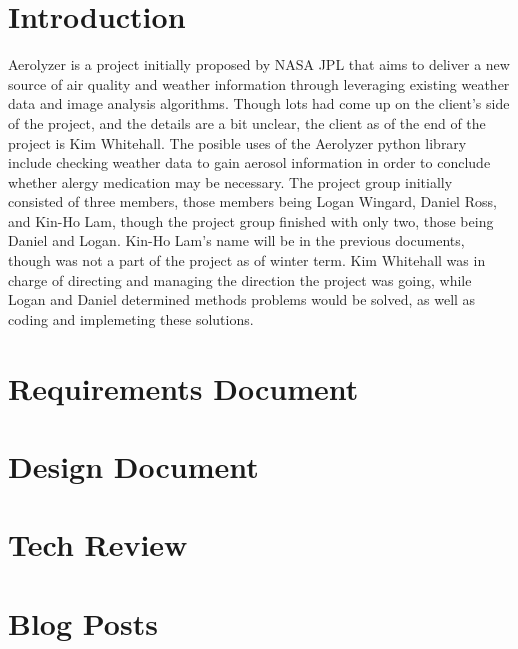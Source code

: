 \documentclass[onecolumn, draftclsnofoot,10pt, compsoc]{IEEEtran}
\begin{document}
\tableofcontents
\clearpage

\begin{singlespace}

	\section{Introduction}
		Aerolyzer is a project initially proposed by NASA JPL that aims to deliver a new source of air quality and weather information through leveraging existing weather data and image analysis algorithms.
		Though lots had come up on the client's side of the project, and the details are a bit unclear, the client as of the end of the project is Kim Whitehall.
		The posible uses of the Aerolyzer python library include checking weather data to gain aerosol information in order to conclude whether alergy medication may be necessary.
		The project group initially consisted of three members, those members being Logan Wingard, Daniel Ross, and Kin-Ho Lam, though the project group finished with only two, those being Daniel and Logan.
		Kin-Ho Lam's name will be in the previous documents, though was not a part of the project as of winter term.
		Kim Whitehall was in charge of directing and managing the direction the project was going, while Logan and Daniel determined methods problems would be solved, as well as coding and implemeting these solutions.
		
	\section{Requirements Document}
		
	\section{Design Document}
		
	\section{Tech Review}
		
	\section{Blog Posts}

\end{singlespace}
\end{document}
